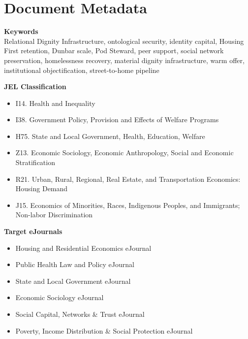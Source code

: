 \documentclass[12pt, letterpaper]{article}
\begin{document}
\newpage
\section*{Document Metadata}

{\footnotesize{}

\noindent\textbf{Keywords}\\[1pt]
Relational Dignity Infrastructure, ontological security, identity capital, Housing First retention, Dunbar scale, Pod Steward, peer support, social network preservation, homelessness recovery, material dignity infrastructure, warm offer, institutional objectification, street-to-home pipeline

\vspace{8pt}
\noindent\textbf{JEL Classification}
\begin{itemize}[nosep, before={\vspace{-8pt}}, leftmargin=2em]
    \item I14. Health and Inequality
    \item I38. Government Policy, Provision and Effects of Welfare Programs
    \item H75. State and Local Government, Health, Education, Welfare
    \item Z13. Economic Sociology, Economic Anthropology, Social and Economic Stratification
    \item R21. Urban, Rural, Regional, Real Estate, and Transportation Economics: Housing Demand
    \item J15. Economics of Minorities, Races, Indigenous Peoples, and Immigrants; Non-labor Discrimination
\end{itemize}

\vspace{8pt}
\noindent\textbf{Target eJournals}
\begin{itemize}[nosep, before={\vspace{-8pt}}, leftmargin=2em]
    \item Housing and Residential Economics eJournal
    \item Public Health Law and Policy eJournal
    \item State and Local Government eJournal
    \item Economic Sociology eJournal
    \item Social Capital, Networks \& Trust eJournal
    \item Poverty, Income Distribution \& Social Protection eJournal
\end{itemize}

}
\end{document}
